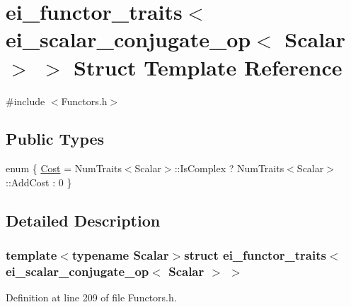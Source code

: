 \hypertarget{structei__functor__traits_3_01ei__scalar__conjugate__op_3_01_scalar_01_4_01_4}{\section{ei\-\_\-functor\-\_\-traits$<$ ei\-\_\-scalar\-\_\-conjugate\-\_\-op$<$ Scalar $>$ $>$ Struct Template Reference}
\label{structei__functor__traits_3_01ei__scalar__conjugate__op_3_01_scalar_01_4_01_4}
}


{\ttfamily \#include $<$Functors.\-h$>$}

\subsection*{Public Types}
\begin{DoxyCompactItemize}
\item 
enum \{ \hyperlink{structei__functor__traits_3_01ei__scalar__conjugate__op_3_01_scalar_01_4_01_4_adf91d1217dfb0d22044b7c2dc3d06d3ea8fa3137e29062cdee3791056deb6fa4d}{Cost} = Num\-Traits$<$Scalar$>$\-:\-:Is\-Complex ? Num\-Traits$<$Scalar$>$\-:\-:Add\-Cost \-: 0
 \}
\end{DoxyCompactItemize}


\subsection{Detailed Description}
\subsubsection*{template$<$typename Scalar$>$struct ei\-\_\-functor\-\_\-traits$<$ ei\-\_\-scalar\-\_\-conjugate\-\_\-op$<$ Scalar $>$ $>$}



Definition at line 209 of file Functors.\-h.



